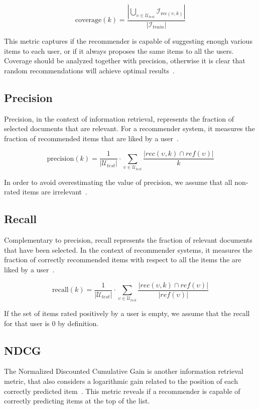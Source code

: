 \begin{equation*}
\mathrm{coverage}(k) = \frac{|\bigcup_{\upsilon \in \mathcal{U}_{test}} \mathcal{I}_{\mathrm{rec}(\upsilon, k)}|}{|\mathcal{I}_{train}|}
\end{equation*}

This metric captures if the recommender is capable of suggesting enough various items to each user, or if it always proposes the same items to all the users. Coverage should be analyzed together with precision, otherwise it is clear that random recommendations will achieve optimal results~\cite{Herlocker2004}.

\subsection{Precision}
Precision, in the context of information retrieval, represents the fraction of selected documents that are relevant. For a recommender system, it measures the fraction of recommended items that are liked by a user~\cite{Sarwar2000}.

\begin{equation*}
\mathrm{precision}(k) = \frac{1}{|\mathcal{U}_{test}|} \cdot \sum_{\upsilon \in \mathcal{U}_{test}} \frac{|rec(\upsilon, k) \cap ref(\upsilon)|}{k}
\end{equation*}

In order to avoid overestimating the value of precision, we assume that all non-rated items are irrelevant~\cite{Steck2013}.

\subsection{Recall}
Complementary to precision, recall represents the fraction of relevant documents that have been selected. In the context of recommender systems, it measures the fraction of correctly recommended items with respect to all the items the are liked by a user~\cite{Sarwar2000}.

\begin{equation*}
\mathrm{recall}(k) = \frac{1}{|\mathcal{U}_{test}|} \cdot \sum_{\upsilon \in \mathcal{U}_{test}} \frac{|rec(\upsilon, k) \cap ref(\upsilon)|}{|ref(\upsilon)|}
\end{equation*}

If the set of items rated positively by a user is empty, we assume that the recall for that user is $0$ by definition.

\subsection{NDCG}
The Normalized Discounted Cumulative Gain is another information retrieval metric, that also considers a logarithmic gain related to the position of each correctly predicted item~\cite{Jaervelin2002}. This metric reveals if a recommender is capable of correctly predicting items at the top of the list.

